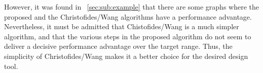 However, it was found in \sectionname~\ref{sec:sub:example} that there are some graphs where the proposed and the
Christofides/Wang algorithms have a performance advantage.  Nevertheless, it must be admitted that Chistofides/Wang
is a much simpler algorithm, and that the various steps in the proposed algorithm do not seem to deliver a decisive
performance advantage over the target range.  Thus, the simplicity of Christofides/Wang makes it a better choice
for the desired design tool.

